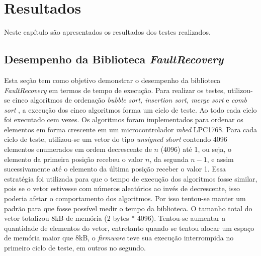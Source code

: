 
\chapter{Resultados} \label{cap:Resultados}

Neste capítulo são apresentados os resultados dos testes realizados. 

\section{Desempenho da Biblioteca \textit{FaultRecovery}} \label{Sec:tempoRecovery}

Esta seção tem como objetivo demonstrar o desempenho da biblioteca \textit{FaultRecovery} em termos de tempo de execução. Para realizar os testes, utilizou-se cinco algoritmos de ordenação \textit{bubble sort, insertion sort, merge sort} e \textit{comb sort} \cite{orderUnicamp, vivaLinux}, a execução dos cinco algoritmos forma um ciclo de teste. Ao todo cada ciclo foi executado cem vezes. Os algoritmos foram implementados para ordenar os elementos em forma crescente em um microcontrolador \textit{mbed} LPC1768. Para cada ciclo de teste, utilizou-se um vetor do tipo \textit{unsigned short} contendo 4096 elementos enumerados em ordem decrescente de $n$ (4096) até 1, ou seja, o elemento da primeira posição recebeu o valor $n$, da segunda $n-1$, e assim sucessivamente até o elemento da última posição receber o valor 1. Essa estratégia foi utilizada para que o tempo de execução dos algoritmos fosse similar, pois se o vetor estivesse com números aleatórios ao invés de decrescente, isso poderia afetar o comportamento dos algoritmos. Por isso tentou-se manter um padrão para que fosse possível medir o tempo da biblioteca. O tamanho total do vetor totalizou 8kB de memória (2 bytes * 4096). Tentou-se aumentar a quantidade de elementos do vetor, entretanto quando se tentou alocar um espaço de memória maior que 8kB, o \textit{firmware} teve sua execução interrompida no primeiro ciclo de teste, em outros no segundo.

